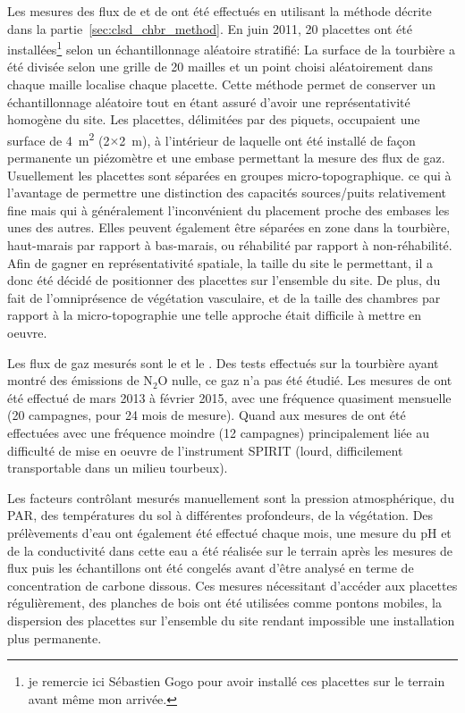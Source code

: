 Les mesures des flux de \coo et de \chh ont été effectués en utilisant la méthode décrite dans la partie~\ref{sec:clsd_chbr_method}.
En juin 2011, 20 placettes ont été installées\footnote{je remercie ici Sébastien Gogo pour avoir installé ces placettes sur le terrain avant même mon arrivée.} selon un échantillonnage aléatoire stratifié:
La surface de la tourbière a été divisée selon une grille de 20 mailles et un point choisi aléatoirement dans chaque maille localise chaque placette.
Cette méthode permet de conserver un échantillonnage aléatoire tout en étant assuré d'avoir une représentativité homogène du site. 
Les placettes, délimitées par des piquets, occupaient une surface de \SI{4}{\square\metre} (2$\times$\SI{2}{\metre}), à l'intérieur de laquelle ont été installé de façon permanente un piézomètre et une embase permettant la mesure des flux de gaz.
Usuellement les placettes sont séparées en groupes micro-topographique. ce qui à l'avantage de permettre une distinction des capacités sources/puits relativement fine mais qui à généralement l'inconvénient du placement proche des embases les unes des autres.
Elles peuvent également être séparées en zone dans la tourbière, haut-marais par rapport à bas-marais, ou réhabilité par rapport à non-réhabilité.
Afin de gagner en représentativité spatiale, la taille du site le permettant, il a donc été décidé de positionner des placettes sur l'ensemble du site.
De plus, du fait de l'omniprésence de végétation vasculaire, et de la taille des chambres par rapport à la micro-topographie une telle approche était difficile à mettre en oeuvre.

Les flux de gaz mesurés sont le \coo et le \chh.
Des tests effectués sur la tourbière ayant montré des émissions de N$_{2}$O nulle, ce gaz n'a pas été étudié.
Les mesures de \coo ont été effectué de mars 2013 à février 2015, avec une fréquence quasiment mensuelle (20 campagnes, pour 24 mois de mesure). Quand aux mesures de \chh ont été effectuées avec une fréquence moindre (12 campagnes) principalement liée au difficulté de mise en oeuvre de l'instrument SPIRIT (lourd, difficilement transportable dans un milieu tourbeux).



Les facteurs contrôlant mesurés manuellement sont la pression atmosphérique, du PAR, des températures du sol à différentes profondeurs, de la végétation.
Des prélèvements d'eau ont également été effectué chaque mois, une mesure du pH et de la conductivité dans cette eau a été réalisée sur le terrain après les mesures de flux puis les échantillons ont été congelés avant d'être analysé en terme de concentration de carbone dissous.
Ces mesures nécessitant d'accéder aux placettes régulièrement, des planches de bois ont été utilisées comme pontons mobiles, la dispersion des placettes sur l'ensemble du site rendant impossible une installation plus permanente.

